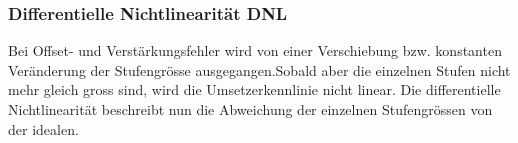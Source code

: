 \subsubsection{Differentielle Nichtlinearität DNL}
Bei Offset- und Verstärkungsfehler wird von einer Verschiebung bzw.
konstanten Veränderung der Stufengrösse ausgegangen.Sobald aber die einzelnen
Stufen nicht mehr gleich gross sind, wird die Umsetzerkennlinie nicht linear.
Die differentielle Nichtlinearität beschreibt nun die Abweichung der einzelnen
Stufengrössen von der idealen.
\begin{figure}[!ht]
\begin{center}
\end{center}
\end{figure}

